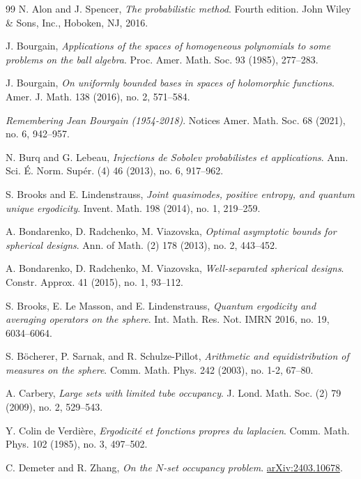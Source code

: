 \documentclass[12pt,reqno]{amsart}
\theoremstyle{plain}
\theoremstyle{definition}
\theoremstyle{remark}
\numberwithin{equation}{section}
\begin{document}
\begin{thebibliography}{99}
 N. Alon and J. Spencer,
\textit{The probabilistic method}. Fourth edition. John Wiley \& Sons, Inc., Hoboken, NJ, 2016. 

 J. Bourgain, 
\textit{Applications of the spaces of homogeneous polynomials to some problems on the ball algebra}. Proc. Amer. Math. Soc. 93 (1985), 277--283.

 J. Bourgain, 
\textit{On uniformly bounded bases in spaces of holomorphic functions}. Amer. J. Math. 138 (2016), no. 2, 571--584.

 \textit{Remembering Jean Bourgain (1954-2018)}. Notices Amer. Math. Soc. 68 (2021), no. 6, 942--957.

 N. Burq and G. Lebeau,
\textit{Injections de Sobolev probabilistes et applications}. Ann. Sci. \'E. Norm. Sup\'er. (4) 46 (2013), no. 6, 917--962.

 S. Brooks and E. Lindenstrauss, 
\textit{Joint quasimodes, positive entropy, and quantum unique ergodicity}. Invent. Math. 198 (2014), no. 1, 219--259.

 A. Bondarenko, D. Radchenko, M. Viazovska, 
\textit{Optimal asymptotic bounds for spherical designs}. Ann. of Math. (2) 178 (2013), no. 2, 443--452.

 A. Bondarenko, D. Radchenko, M. Viazovska, 
\textit{Well-separated spherical designs}. Constr. Approx. 41 (2015), no. 1, 93--112.

 S. Brooks, E. Le Masson, and E. Lindenstrauss, 
\textit{Quantum ergodicity and averaging operators on the sphere}. Int. Math. Res. Not. IMRN 2016, no. 19, 6034--6064. 

 S. B\"ocherer, P. Sarnak, and R. Schulze-Pillot, 
\textit{Arithmetic and equidistribution of measures on the sphere}. Comm. Math. Phys. 242 (2003), no. 1-2, 67--80.

 A. Carbery, 
\textit{Large sets with limited tube occupancy}. J. Lond. Math. Soc. (2) 79 (2009), no. 2, 529--543. 

 Y. Colin de Verdi\`ere,
\textit{Ergodicit\'e et fonctions propres du laplacien}. Comm. Math. Phys. 102 (1985), no. 3, 497--502.

 C. Demeter and R. Zhang,
\textit{On the $N$-set occupancy problem}. \href{https://arxiv.org/abs/2403.10678}{arXiv:2403.10678}.


\end{thebibliography}
\end{document}
